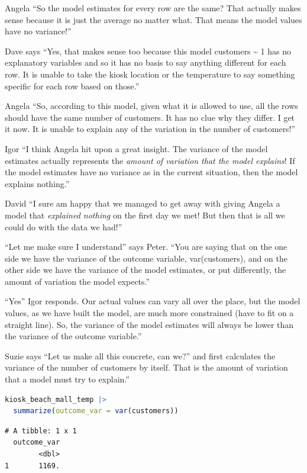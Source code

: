 \documentclass[
  12pt,
  letterpaper,
  DIV=11,
  numbers=noendperiod]{scrreprt}
\begin{document}
Angela ``So the model estimates for every row are the same? That
actually makes sense because it is just the average no matter what. That
means the model values have no variance!''

Dave says ``Yes, that makes sense too because this model customers
\textasciitilde{} 1 has no explanatory variables and so it has no basis
to say anything different for each row. It is unable to take the kiosk
location or the temperature to say something specific for each row based
on those.''

Angela ``So, according to this model, given what it is allowed to use,
all the rows should have the same number of customers. It has no clue
why they differ. I get it now. It is unable to explain any of the
variation in the number of customers!''

Igor ``I think Angela hit upon a great insight. The variance of the
model estimates actually represents the \emph{amount of variation that
the model explains}! If the model estimates have no variance as in the
current situation, then the model explains nothing.''

David ``I sure am happy that we managed to get away with giving Angela a
model that \emph{explained nothing} on the first day we met! But then
that is all we could do with the data we had!''

``Let me make sure I understand'' says Peter. ``You are saying that on
the one side we have the variance of the outcome variable,
var(customers), and on the other side we have the variance of the model
estimates, or put differently, the amount of variation the model
expects.''

``Yes'' Igor responds. Our actual values can vary all over the place,
but the model values, as we have built the model, are much more
constrained (have to fit on a straight line). So, the variance of the
model estimates will always be lower than the variance of the outcome
variable.''

Suzie says ``Let us make all this concrete, can we?'' and first
calculates the variance of the number of customers by itself. That is
the amount of variation that a model must try to explain.''

\begin{lstlisting}[language=R]
kiosk_beach_mall_temp |> 
  summarize(outcome_var = var(customers))
\end{lstlisting}

\begin{lstlisting}
# A tibble: 1 x 1
  outcome_var
        <dbl>
1       1169.
\end{lstlisting}
\end{document}
